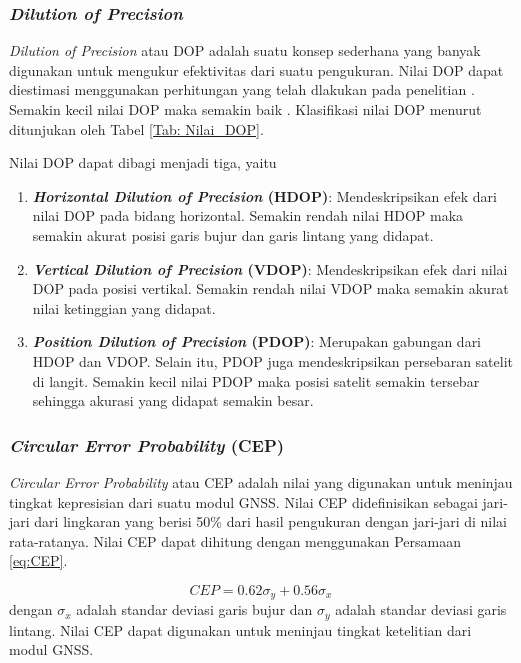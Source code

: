 \subsubsection{\textit{Dilution of Precision}}
\textit{Dilution of Precision} atau DOP adalah suatu konsep sederhana yang banyak digunakan untuk mengukur efektivitas dari suatu pengukuran. Nilai DOP dapat diestimasi menggunakan perhitungan yang telah dlakukan pada penelitian \cite{Tahsin2015} . Semakin kecil nilai DOP maka semakin baik \cite{Hofmann-Wellenhof2008}. Klasifikasi nilai DOP menurut \cite{Langley1999} ditunjukan oleh Tabel \ref{Tab: Nilai_DOP}.

Nilai DOP dapat dibagi menjadi tiga, yaitu
\begin{enumerate}
	\item \textbf{\textit{Horizontal Dilution of Precision} (HDOP)}: Mendeskripsikan efek dari nilai DOP pada bidang horizontal. Semakin rendah nilai HDOP maka semakin akurat posisi garis bujur dan garis lintang yang didapat.
	\item \textbf{\textit{Vertical Dilution of Precision} (VDOP)}: Mendeskripsikan efek dari nilai DOP pada posisi vertikal. Semakin rendah nilai VDOP maka semakin akurat nilai ketinggian yang didapat.
	\item \textbf{\textit{Position Dilution of Precision} (PDOP)}: Merupakan gabungan dari HDOP dan VDOP. Selain itu, PDOP juga mendeskripsikan persebaran satelit di langit. Semakin kecil nilai PDOP maka posisi satelit semakin tersebar sehingga akurasi yang didapat semakin besar.
\end{enumerate}

\subsubsection{\textit{Circular Error Probability} (CEP)}
\textit{Circular Error Probability} atau CEP adalah nilai yang digunakan untuk meninjau tingkat kepresisian dari suatu modul GNSS. Nilai CEP didefinisikan sebagai jari-jari dari lingkaran yang berisi 50\% dari hasil pengukuran dengan jari-jari di nilai rata-ratanya. Nilai CEP dapat dihitung dengan menggunakan Persamaan \ref{eq:CEP}.

\begin{equation}
CEP = 0.62 \sigma_y + 0.56 \sigma_x
\label{eq:CEP}
\end{equation}
dengan $\sigma_x$ adalah standar deviasi garis bujur dan $\sigma_y$ adalah standar deviasi garis lintang. Nilai CEP dapat digunakan untuk meninjau tingkat ketelitian dari modul GNSS.

